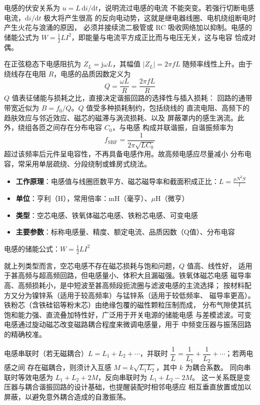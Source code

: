 电感的伏安关系为 $u = L\,\mathrm{d}i/\mathrm{d}t$，说明流过电感的电流
不能突变。若强行切断电感电流，$\mathrm{d}i/\mathrm{d}t$ 极大将产生很高
的反向电动势，这就是继电器线圈、电机绕组断电时产生火花与浪涌的原因，
必须并接续流二极管或 RC 吸收网络加以抑制。电感的储能公式为
$W = \tfrac{1}{2}LI^2$，即能量与电流平方成正比而与电压无关，这与电容
恰成对偶。

在正弦稳态下电感阻抗为 $Z_L = \mathrm{j}\omega L$，其幅值 $|Z_L| = 2\pi f L$
随频率线性上升。由于绕线存在电阻 $R$，电感的品质因数定义为
\begin{equation}
Q = \frac{\omega L}{R} = \frac{2\pi f L}{R}
\end{equation}
$Q$ 值表征储能与损耗之比，直接决定谐振回路的选择性与插入损耗：
回路的通带带宽近似为 $B = f_0/Q$。$Q$ 值受多种损耗制约，包括绕线的
直流电阻、高频下的趋肤效应与邻近效应、磁芯的磁滞与涡流损耗、以及
屏蔽罩内的感生涡流。此外，绕组各匝之间存在分布电容 $C_0$，与电感
构成并联谐振，自谐振频率为
\[
f_{\mathrm{SRF}} = \frac{1}{2\pi\sqrt{L C_0}}
\]
超过该频率后元件呈电容性，不再具备电感作用。故高频电感应尽量减小
分布电容，常采用单层疏绕、分段绕制或蜂房式绕法。

\begin{itemize}
    \item \textbf{工作原理}：电感值与线圈匝数平方、磁芯磁导率和截面积成正比：$L = \frac{\mu N^2 S}{l}$
    \item \textbf{单位}：亨利（H），常用倍率：mH（毫亨）、$\mu$H（微亨）
    \item \textbf{类型}：空芯电感、铁氧体磁芯电感、铁粉芯电感、可变电感
    \item \textbf{主要参数}：标称电感量、精度、额定电流、品质因数（Q值）、分布电容
\end{itemize}

电感的储能公式：$W = \frac{1}{2}LI^2$

就上列类型而言，空芯电感不存在磁芯损耗与饱和问题，$Q$ 值高、线性好，
适用于甚高频与超高频回路，但电感量小、体积大且漏磁强。铁氧体磁芯电感
磁导率高、高频损耗小，是中短波至甚高频段扼流圈与滤波电感的主流选择；
按材料配方又分为镍锌系（适用于较高频率）与锰锌系（适用于较低频率、
磁导率更高）。铁粉芯（含铁硅铝等粉末芯）由绝缘包覆的磁性颗粒压制而成，
分布气隙使其抗饱和能力强、直流叠加特性好，广泛用于开关电源的储能电感
与差模滤波。可变电感通过旋动磁芯改变磁路耦合程度来微调电感量，用于
中频变压器与振荡回路的精确校准。

电感串联时（若无磁耦合）$L = L_1 + L_2 + \cdots$，并联时
$\dfrac{1}{L} = \dfrac{1}{L_1} + \dfrac{1}{L_2} + \cdots$；若两电感之间
存在磁耦合，则须计入互感 $M = k\sqrt{L_1L_2}$，其中 $k$ 为耦合系数。
同向串联时等效电感为 $L_1 + L_2 + 2M$，反向串联时为 $L_1 + L_2 - 2M$。
这一关系既是变压器与耦合谐振回路的设计基础，也提醒装配时相邻电感应
相互垂直放置或加以屏蔽，以避免意外耦合造成的自激振荡。

